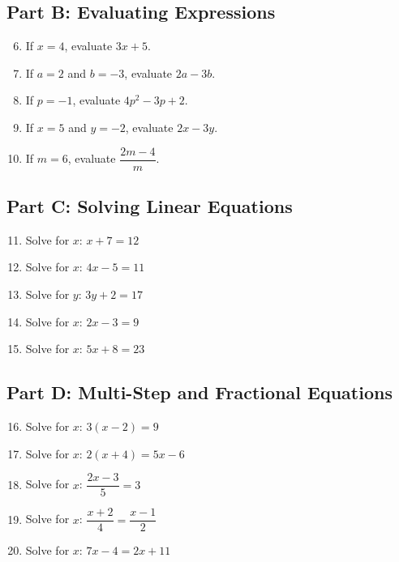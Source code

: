 \documentclass[14pt]{extarticle}
\begin{document}
\subsection*{Part B: Evaluating Expressions}
\begin{enumerate}
    \setcounter{enumi}{5}
    \item If \(x = 4\), evaluate \(3x + 5\).
    \item If \(a = 2\) and \(b = -3\), evaluate \(2a - 3b\).
    \item If \(p = -1\), evaluate \(4p^2 - 3p + 2\).
    \item If \(x = 5\) and \(y = -2\), evaluate \(2x - 3y\).
    \item If \(m = 6\), evaluate \(\dfrac{2m - 4}{m}\).
\end{enumerate}

\subsection*{Part C: Solving Linear Equations}
\begin{enumerate}
    \setcounter{enumi}{10}
    \item Solve for \(x\): \(x + 7 = 12\)
    \item Solve for \(x\): \(4x - 5 = 11\)
    \item Solve for \(y\): \(3y + 2 = 17\)
    \item Solve for \(x\): \(2x - 3 = 9\)
    \item Solve for \(x\): \(5x + 8 = 23\)
\end{enumerate}

\subsection*{Part D: Multi-Step and Fractional Equations}
\begin{enumerate}
    \setcounter{enumi}{15}
    \item Solve for \(x\): \(3(x - 2) = 9\)
    \item Solve for \(x\): \(2(x + 4) = 5x - 6\)
    \item Solve for \(x\): \(\dfrac{2x - 3}{5} = 3\)
    \item Solve for \(x\): \(\dfrac{x + 2}{4} = \dfrac{x - 1}{2}\)
    \item Solve for \(x\): \(7x - 4 = 2x + 11\)
\end{enumerate}

\newpage

\end{document}
